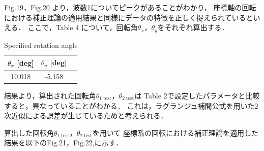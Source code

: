\documentclass[twocolumn,a4j]{jsarticle}
\begin{document}
Fig.19，Fig.20 より，波数1についてピークがあることがわかり，
座標軸の回転における補正理論の適用結果と同様にデータの特徴を正しく捉えられているといえる．
ここで，Table 4 について，回転角$\theta_x$，$\theta_y$をそれぞれ算出する．

\begin{table}[htbp]
    \begin{center}
        \caption{Specified rotation angle}
        \begin{tabular}{|p{30mm}|p{20mm}|p{20mm}|}
            \hline
            \multicolumn{1}{|c|}{$\theta_x$ [deg]} & \multicolumn{1}{|c|}{$\theta_y$ [deg]} \\ \hline
            \multicolumn{1}{|c|}{10.018}           & \multicolumn{1}{|c|}{-5.158}           \\ \hline
        \end{tabular}
    \end{center}
\end{table}

結果より，算出された回転角$\theta_{1\;\mathrm{test}}$，$\theta_{2\;\mathrm{test}}$は
Table 2で設定したパラメータと比較すると，異なっていることがわかる．
これは，ラグランジュ補間公式を用いた2次近似による誤差が生じているためと考えられる．

算出した回転角$\theta_{1\;\mathrm{test}}$，$\theta_{2\;\mathrm{test}}$を用いて
座標系の回転における補正理論を適用した結果を以下のFig.21，Fig.22,に示す．

\newpage
\end{document}
